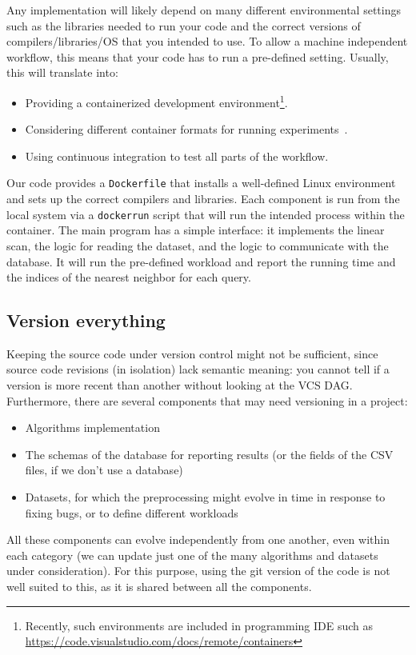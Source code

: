\documentclass{llncs}
\newcommand{\cetodo}[1]{\todo[inline, color=orange!50]{#1}}
\begin{document}
Any implementation will likely depend on many different environmental settings such as the libraries needed to run your code and the correct versions of compilers/libraries/OS that you intended to use. To allow a machine independent workflow, this means that your code has to run a pre-defined setting. Usually, this will translate into:
\begin{itemize}
  \item Providing a containerized development environment\footnote{Recently, such environments are included in programming IDE such as \url{https://code.visualstudio.com/docs/remote/containers}}.
  \item Considering different container formats for running experiments~\cite{arango2017performance}.
  \item Using continuous integration to test all parts of the workflow.
\end{itemize}
%
Our code provides a {\tt Dockerfile} that installs a well-defined Linux environment and sets up the correct compilers and libraries. 
Each component is run from the local system via a {\tt dockerrun} script that will run the intended process within the container. 
The main program has a simple interface: it implements the linear scan, the logic for reading the dataset, and the logic to communicate with the database. 
It will run the pre-defined workload and report the running time and the indices of the nearest neighbor for each query.

\subsection{Version everything}

Keeping the source code under version control might not be sufficient, since
source code revisions (in isolation) lack semantic meaning: you cannot tell
if a version is more recent than another without looking at the VCS DAG.
Furthermore, there are several components that may need versioning in
a project:
\begin{itemize}
  \item Algorithms implementation
  \item The schemas of the database for reporting results (or the fields of 
    the CSV files, if we don't use a database)
  \item Datasets, for which the preprocessing might evolve in time in 
    response to fixing bugs, or to define different workloads
\end{itemize}
All these components can evolve independently from one another, even within each category
(we can update just one of the many algorithms and datasets under consideration).
For this purpose, using the git version of the code is not well suited to this, as it is
shared between all the components.
\end{document}
